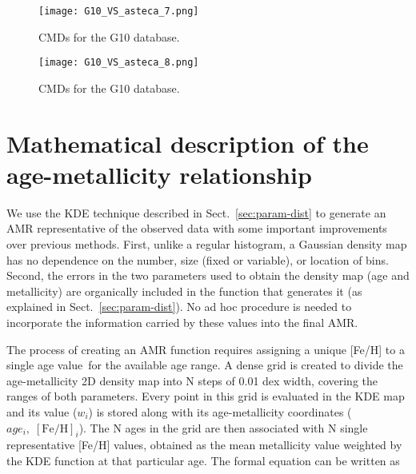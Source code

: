 \documentclass{aa}
\begin{document}
\begin{appendix}
\begin{figure*}
\texttt{[image: G10\_VS\_asteca\_7.png]}
\caption{CMDs for the G10 database.}
\label{fig:DBs_G10_7}
\end{figure*}
\clearpage

\begin{figure}
\centering
\texttt{[image: G10\_VS\_asteca\_8.png]}
\caption{CMDs for the G10 database.}
\label{fig:DBs_G10_8}
\end{figure}





\section{Mathematical description of the age-metallicity relationship}
\label{apdx:amr_description}

We use the KDE technique described in Sect.~\ref{sec:param-dist} to
generate an AMR representative of the observed data with some important
improvements over previous methods.
%
First, unlike a regular histogram, a Gaussian density map has no dependence on
the number, size (fixed or variable), or location of bins.
Second, the errors in the two parameters used to obtain the density map (age and
metallicity) are organically included in the function that generates it
(as explained in Sect.~\ref{sec:param-dist}). No ad hoc procedure is needed to
incorporate the information carried by these values into the final AMR.\@

The process of creating an AMR function
requires assigning a unique [Fe/H] to a single age value\ for the available age
range.
%
A dense grid is created to divide the age-metallicity 2D density map into N
steps of 0.01 dex width, covering the ranges of both parameters. Every point in
this grid is evaluated in the KDE map and its value ($w_{i}$) is stored along
with its age-metallicity coordinates ($age_{i},\;[\mathrm{Fe/H}]_{i}$).
%
The N ages in the grid are then associated with N single representative [Fe/H]
values, obtained as the mean metallicity value weighted by the KDE function at
that particular age. The formal equation can be written as


\end{appendix}
\end{document}
